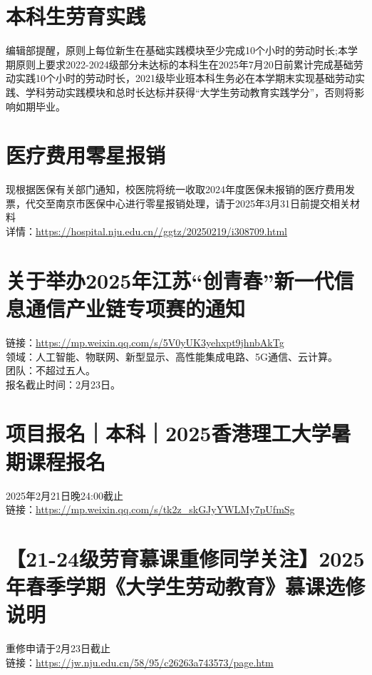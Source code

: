 \documentclass[letterpaper, 12pt]{article}
\begin{document}
\begin{multicols}{2}
\section{本科生劳育实践}
编辑部提醒，原则上每位新生在基础实践模块至少完成10个小时的劳动时长;本学期原则上要求2022-2024级部分未达标的本科生在2025年7月20日前累计完成基础劳动实践10个小时的劳动时长，2021级毕业班本科生务必在本学期末实现基础劳动实践、学科劳动实践模块和总时长达标并获得“大学生劳动教育实践学分”，否则将影响如期毕业。\\
\section{医疗费用零星报销}
现根据医保有关部门通知，校医院将统一收取2024年度医保未报销的医疗费用发票，代交至南京市医保中心进行零星报销处理，请于2025年3月31日前提交相关材料\\
详情：\url{https://hospital.nju.edu.cn//ggtz/20250219/i308709.html}\\
\section{关于举办2025年江苏“创青春”新一代信息通信产业链专项赛的通知}
链接：\url{https://mp.weixin.qq.com/s/5V0yUK3yehxpt9jhnbAkTg}\\
领域：人工智能、物联网、新型显示、高性能集成电路、5G通信、云计算。\\
团队：不超过五人。\\
报名截止时间：2月23日。
\section{项目报名｜本科｜2025香港理工大学暑期课程报名}
2025年2月21日晚24:00截止\\
链接：\url{https://mp.weixin.qq.com/s/tk2z_skGJyYWLMy7pUfmSg}\\

\section{【21-24级劳育慕课重修同学关注】2025年春季学期《大学生劳动教育》慕课选修说明}
重修申请于2月23日截止\\
链接：\url{https://jw.nju.edu.cn/58/95/c26263a743573/page.htm}\\


\end{multicols}
\end{document}
